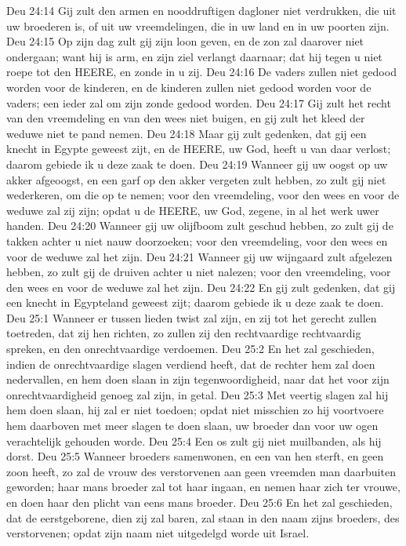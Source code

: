 Deu 24:14  Gij zult den armen en nooddruftigen dagloner niet verdrukken, die uit uw broederen is, of uit uw vreemdelingen, die in uw land en in uw poorten zijn.
Deu 24:15  Op zijn dag zult gij zijn loon geven, en de zon zal daarover niet ondergaan; want hij is arm, en zijn ziel verlangt daarnaar; dat hij tegen u niet roepe tot den HEERE, en zonde in u zij.
Deu 24:16  De vaders zullen niet gedood worden voor de kinderen, en de kinderen zullen niet gedood worden voor de vaders; een ieder zal om zijn zonde gedood worden.
Deu 24:17  Gij zult het recht van den vreemdeling en van den wees niet buigen, en gij zult het kleed der weduwe niet te pand nemen.
Deu 24:18  Maar gij zult gedenken, dat gij een knecht in Egypte geweest zijt, en de HEERE, uw God, heeft u van daar verlost; daarom gebiede ik u deze zaak te doen.
Deu 24:19  Wanneer gij uw oogst op uw akker afgeoogst, en een garf op den akker vergeten zult hebben, zo zult gij niet wederkeren, om die op te nemen; voor den vreemdeling, voor den wees en voor de weduwe zal zij zijn; opdat u de HEERE, uw God, zegene, in al het werk uwer handen.
Deu 24:20  Wanneer gij uw olijfboom zult geschud hebben, zo zult gij de takken achter u niet nauw doorzoeken; voor den vreemdeling, voor den wees en voor de weduwe zal het zijn.
Deu 24:21  Wanneer gij uw wijngaard zult afgelezen hebben, zo zult gij de druiven achter u niet nalezen; voor den vreemdeling, voor den wees en voor de weduwe zal het zijn.
Deu 24:22  En gij zult gedenken, dat gij een knecht in Egypteland geweest zijt; daarom gebiede ik u deze zaak te doen.
Deu 25:1  Wanneer er tussen lieden twist zal zijn, en zij tot het gerecht zullen toetreden, dat zij hen richten, zo zullen zij den rechtvaardige rechtvaardig spreken, en den onrechtvaardige verdoemen.
Deu 25:2  En het zal geschieden, indien de onrechtvaardige slagen verdiend heeft, dat de rechter hem zal doen nedervallen, en hem doen slaan in zijn tegenwoordigheid, naar dat het voor zijn onrechtvaardigheid genoeg zal zijn, in getal.
Deu 25:3  Met veertig slagen zal hij hem doen slaan, hij zal er niet toedoen; opdat niet misschien zo hij voortvoere hem daarboven met meer slagen te doen slaan, uw broeder dan voor uw ogen verachtelijk gehouden worde.
Deu 25:4  Een os zult gij niet muilbanden, als hij dorst.
Deu 25:5  Wanneer broeders samenwonen, en een van hen sterft, en geen zoon heeft, zo zal de vrouw des verstorvenen aan geen vreemden man daarbuiten geworden; haar mans broeder zal tot haar ingaan, en nemen haar zich ter vrouwe, en doen haar den plicht van eens mans broeder.
Deu 25:6  En het zal geschieden, dat de eerstgeborene, dien zij zal baren, zal staan in den naam zijns broeders, des verstorvenen; opdat zijn naam niet uitgedelgd worde uit Israel.
